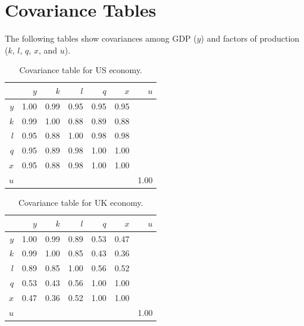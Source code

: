 \documentclass[preprint,authoryear,12pt]{elsarticle}\usepackage{graphicx, color}
\begin{document}
\appendix

\section{Covariance Tables}
\setcounter{table}{0} %

The following tables show covariances among GDP ($y$) and factors of production ($k$, $l$, $q$, $x$, and $u$).

\begin{table}[H]
\begin{center}
\caption{Covariance table for  US economy.}
\label{tab:Covariance_US}
\begin{tabular}{rrrrrrr}
  \hline
 & $y$ & $k$ & $l$ & $q$ & $x$ & $u$ \\ 
  \hline
$y$ & 1.00 & 0.99 & 0.95 & 0.95 & 0.95 &  \\ 
  $k$ & 0.99 & 1.00 & 0.88 & 0.89 & 0.88 &  \\ 
  $l$ & 0.95 & 0.88 & 1.00 & 0.98 & 0.98 &  \\ 
  $q$ & 0.95 & 0.89 & 0.98 & 1.00 & 1.00 &  \\ 
  $x$ & 0.95 & 0.88 & 0.98 & 1.00 & 1.00 &  \\ 
  $u$ &  &  &  &  &  & 1.00 \\ 
   \hline
\end{tabular}
\end{center}
\end{table}



\begin{table}[H]
\begin{center}
\caption{Covariance table for  UK economy.}
\label{tab:Covariance_UK}
\begin{tabular}{rrrrrrr}
  \hline
 & $y$ & $k$ & $l$ & $q$ & $x$ & $u$ \\ 
  \hline
$y$ & 1.00 & 0.99 & 0.89 & 0.53 & 0.47 &  \\ 
  $k$ & 0.99 & 1.00 & 0.85 & 0.43 & 0.36 &  \\ 
  $l$ & 0.89 & 0.85 & 1.00 & 0.56 & 0.52 &  \\ 
  $q$ & 0.53 & 0.43 & 0.56 & 1.00 & 1.00 &  \\ 
  $x$ & 0.47 & 0.36 & 0.52 & 1.00 & 1.00 &  \\ 
  $u$ &  &  &  &  &  & 1.00 \\ 
   \hline
\end{tabular}
\end{center}
\end{table}
\end{document}
